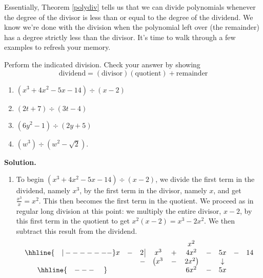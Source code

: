 Essentially, Theorem \ref{polydiv} tells us that we can divide polynomials whenever the degree of the divisor is less than or equal to the degree of the dividend.  We know we're done with the division when the polynomial left over (the remainder) has a degree strictly less than the divisor.  It's time to walk through a few examples to refresh your memory.

\begin{ex}\label{polynomiallongdivex}  Perform the indicated division.  Check your answer by showing \[\text{dividend} = (\text{divisor})( \text{quotient}) + \text{remainder}\]

\begin{enumerate}

\item  $\left(x^3 + 4x^2 - 5x - 14\right) \div (x-2)$

\item  $\left(2t +  7\right) \div \left(3t - 4\right)$

\item  $\left(6y^2 - 1 \right) \div \left(2y + 5\right)$

\item  $\left(w^3 \right) \div \left(w^2 - \sqrt{2}\right)$.

\setcounter{HW}{\value{enumi}}

\end{enumerate}

{\bf Solution.}

\begin{enumerate}

\item  To begin $\left(x^3 + 4x^2 - 5x - 14\right) \div (x-2)$, we divide the first term in the dividend, namely $x^3$, by the first term in the divisor, namely $x$, and get $\frac{x^3}{x} = x^2$. This then becomes the first term in the quotient.  We proceed as in regular long division at this point: we multiply the entire divisor, $x-2$, by this first term in the quotient to get $x^{2}(x - 2) = x^3 - 2x^2$.  We then subtract this result from the dividend.\setlength\arraycolsep{0.1pt}\setlength\extrarowheight{2pt}\[ \begin{array}{cccccccccc}

& & & & & x^2 & & &  &  \\ \hhline{~~~|-------}

x & - & 2 \, \vline& x^3 & + & 4x^2 & - & 5x & - & 14 \\

 &  &  -& \left(x^3 \right. & - & \left.  2x^2\right) &  & \downarrow &  &  \\ \hhline{~~~---~~~~} 
 &  &  &   &  & 6 x^2 & - & 5x &  &  \\ 
 

\end{array}\]
\end{enumerate}
\end{ex}
